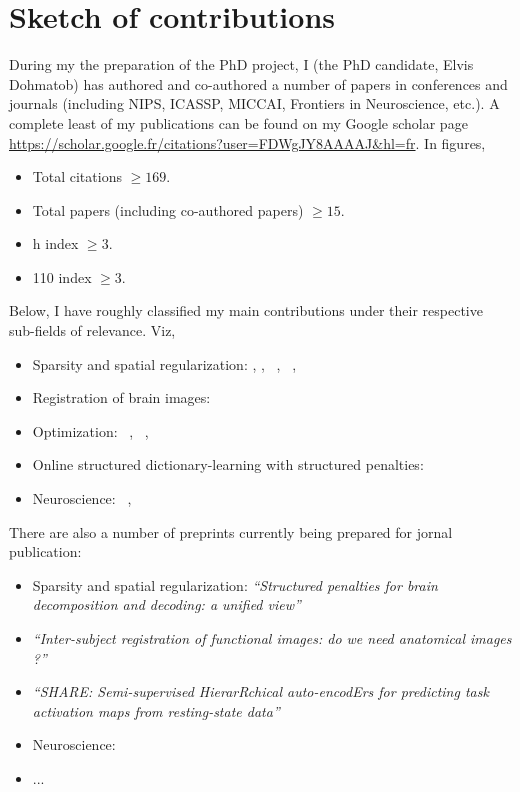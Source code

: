 \section{Sketch of contributions}
\label{sec:contrib}
During my the preparation of the PhD project, I (the PhD
candidate, Elvis Dohmatob) has authored and co-authored a number of papers in conferences and journals (including NIPS, ICASSP, MICCAI,
Frontiers in Neuroscience, etc.).
A complete least of my publications can be found on my Google scholar page \url{https://scholar.google.fr/citations?user=FDWgJY8AAAAJ&hl=fr}. In figures,
\begin{shaded}
\begin{itemize}
\item Total citations $\ge 169$.
  \item Total papers (including co-authored papers) $\ge 15$.
  \item h index $\ge 3$.
  \item 110 index $ \ge 3$.
  \end{itemize}
\end{shaded}  
Below, I  have roughly classified my main contributions under their respective sub-fields of relevance. Viz,
\begin{shaded}
\begin{itemize}
  \item{Sparsity and spatial regularization:}
     \citep{dohmatob2014benchmarking},  \citep{dohmatob2015speeding},
     ~\citep{abrahamregion},  ~\citep{eickenberg2015total},
     ~\citep{pelle2016multivariate}
  \item{Registration of brain images:}
    ~\citep{dohmatob2016epi2epi}
  \item{Optimization:}
     ~\citep{dohmatob2015local},  ~\citep{varoquaux2015faasta},  ~\citep{dohmatob2015simple}
  \item{Online structured dictionary-learning with structured penalties:}
     ~\citep{dohmatob2016}
  \item{Neuroscience:}
     ~\citep{rahim2015integrating},  ~\citep{thirion2014fmri}
\end{itemize}
\end{shaded}

There are also a number of preprints currently being prepared for jornal publication:

\begin{shaded}
\begin{itemize}
  \item{Sparsity and spatial regularization:}
     \textit{``Structured penalties for brain decomposition and decoding: a unified view''}
   \item \textit{``Inter-subject registration of functional images: do we need anatomical images ?''}
   \item \textit{``SHARE: Semi-supervised HierarRchical auto-encodErs for predicting task activation maps
     from resting-state data''}
 \item{Neuroscience:}
   \item ...
\end{itemize}
\end{shaded}


